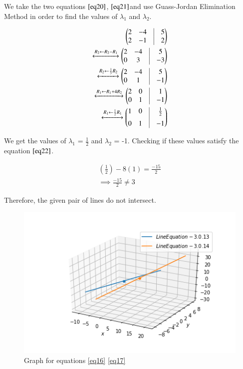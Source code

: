 \documentclass[journal,12pt,twocolumn]{IEEEtran}
\begin{document}
\begin{enumerate}
We take the two equations $\ref{eq20}$, $\ref{eq21}$and use Guass-Jordan Elimination Method in order to find the values of $\lambda_1$ and $\lambda_2$.



\begin{align}
	\myvec{
		2 & -4 & \vrule & 5 \\
		2 & -1 & \vrule & 2 \\
	}
	\\
	\xleftrightarrow[]{R_2 \leftarrow R_2-R_1}
	\myvec{
		2 & -4 & \vrule & 5 \\
		0 & 3 & \vrule & -3 \\
	}
	\\
	\xleftrightarrow[]{R_2\leftarrow \frac{1}{3}R_2} 
	\myvec{
		2 & -4 & \vrule & 5 \\
		0 & 1 & \vrule & -1 \\
	}
	\\
	\xleftrightarrow[]{R_1 \leftarrow R_1+4R_2}
	\myvec{
		2 & 0 & \vrule & 1 \\
		0 & 1 & \vrule & -1 \\
	}
	\\
	\xleftrightarrow[]{R_1 \leftarrow \frac{1}{2}R_1}
	\myvec{
		1 & 0 & \vrule & \frac{1}{2} \\[0.2cm]
		0 & 1 & \vrule & -1 \\
	}
\end{align}

We get the values of $\lambda_1$ = $\frac{1}{2}$ and $\lambda_2$ = -1. Checking if these values satisfy the equation $\ref{eq22}$.

\begin{align}
	\left(\frac{1}{2}\right) - 8\left(1\right) = \frac{-15}{2} \\
	\implies \frac{-15}{2} \neq 3
\end{align}

Therefore, the given pair of lines do not intersect.


\begin{figure}
	\centering
	\includegraphics[width=\columnwidth]{./codes/figs/Line_interest_2.png}
	\caption{Graph for equations \ref{eq16} \ref{eq17}}
	\label{fig:line_equation_2}
\end{figure}
\end{enumerate}

    
\end{document}
